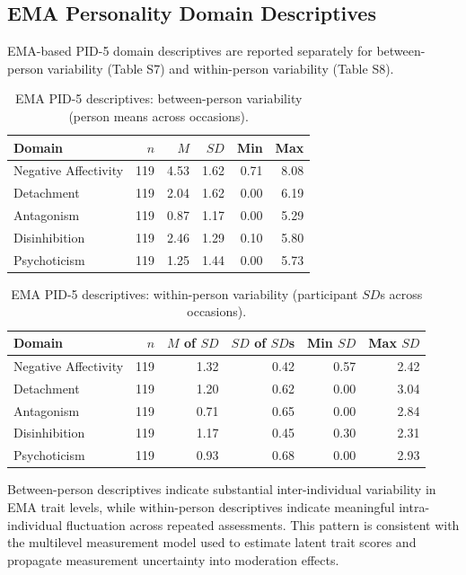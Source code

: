 \documentclass[
  english,
  man,floatsintext]{apa6}
\begin{document}
\subsection{EMA Personality Domain Descriptives}\label{ema-personality-domain-descriptives}

EMA-based PID-5 domain descriptives are reported separately for between-person variability (Table S7) and within-person variability (Table S8).

\begin{table}

\caption{\label{tab:table-s6-ema-between}EMA PID-5 descriptives: between-person variability (person means across occasions).}
\centering
\begin{tabular}[t]{lrrrrr}
\toprule
Domain & $n$ & $M$ & $SD$ & Min & Max\\
\midrule
Negative Affectivity & 119 & 4.53 & 1.62 & 0.71 & 8.08\\
Detachment & 119 & 2.04 & 1.62 & 0.00 & 6.19\\
Antagonism & 119 & 0.87 & 1.17 & 0.00 & 5.29\\
Disinhibition & 119 & 2.46 & 1.29 & 0.10 & 5.80\\
Psychoticism & 119 & 1.25 & 1.44 & 0.00 & 5.73\\
\bottomrule
\end{tabular}
\end{table}

\begin{table}

\caption{\label{tab:table-s7-ema-within}EMA PID-5 descriptives: within-person variability (participant $SD$s across occasions).}
\centering
\begin{tabular}[t]{lrrrrr}
\toprule
Domain & $n$ & $M$ of $SD$ & $SD$ of $SD$s & Min $SD$ & Max $SD$\\
\midrule
Negative Affectivity & 119 & 1.32 & 0.42 & 0.57 & 2.42\\
Detachment & 119 & 1.20 & 0.62 & 0.00 & 3.04\\
Antagonism & 119 & 0.71 & 0.65 & 0.00 & 2.84\\
Disinhibition & 119 & 1.17 & 0.45 & 0.30 & 2.31\\
Psychoticism & 119 & 0.93 & 0.68 & 0.00 & 2.93\\
\bottomrule
\end{tabular}
\end{table}

Between-person descriptives indicate substantial inter-individual variability in EMA trait levels, while within-person descriptives indicate meaningful intra-individual fluctuation across repeated assessments. This pattern is consistent with the multilevel measurement model used to estimate latent trait scores and propagate measurement uncertainty into moderation effects.
\end{document}
